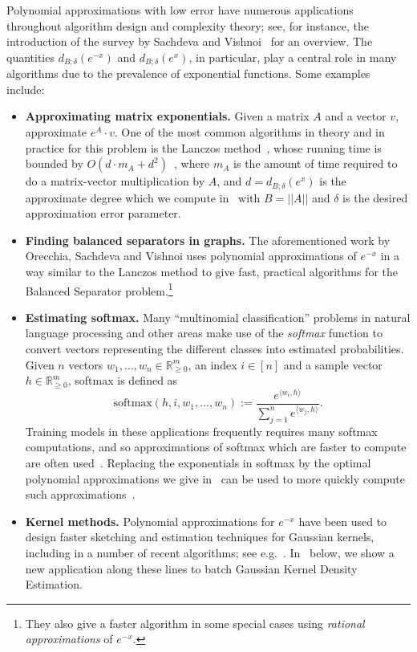 \documentclass[10pt,a4paper]{article}
\newcommand{\R}{\mathbb{R}}
\theoremstyle{plain}\newtheorem{theorem}{Theorem}
\theoremstyle{definition}
\begin{document}
Polynomial approximations with low error have numerous applications throughout algorithm design and complexity theory; see, for instance, the introduction of the survey by Sachdeva and Vishnoi~\cite{sachdeva2014faster} for an overview. 
The quantities $d_{B; \delta} (e^{-x})$ and $d_{B; \delta} (e^{x})$, in particular, play a central role in many algorithms due to the prevalence of exponential functions. Some examples include:
\begin{itemize}
    \item \textbf{Approximating matrix exponentials.} Given a matrix $A$ and a vector $v$, approximate $e^A \cdot v$. One of the most common algorithms in theory and in practice for this problem is the Lanczos method~\cite{lanczos1950iteration}, whose running time is bounded by $O(d \cdot m_A + d^2)$~\cite{musco2018stability}, where $m_A$ is the amount of time required to do a matrix-vector multiplication by $A$, and $d = d_{B; \delta} (e^{x})$ is the approximate degree which we compute in~ with $B = ||A||$ and $\delta$ is the desired approximation error parameter.
    \item \textbf{Finding balanced separators in graphs.} The aforementioned work by Orecchia, Sachdeva and Vishnoi \cite{orecchia2012approximating} uses polynomial approximations of $e^{-x}$ in a way similar to the Lanczos method to give fast, practical algorithms for the Balanced Separator problem.\footnote{They also give a faster algorithm in some special cases using \emph{rational approximations} of $e^{-x}$.}
    \item \textbf{Estimating softmax.} Many ``multinomial classification'' problems in natural language processing and other areas make use of the \emph{softmax} function to convert vectors representing the different classes into estimated probabilities. Given $n$ vectors $w_1, \ldots, w_n \in \R_{\geq 0}^m$, an index $i \in [n]$ and a sample vector $h \in \R_{\geq 0}^m$, softmax is defined as $$\text{softmax}(h,i,w_1,\ldots,w_n) := \frac{e^{\langle w_i, h \rangle}}{\sum_{j=1}^n e^{\langle w_j, h \rangle}}.$$ Training models in these applications frequently requires many softmax computations, and so approximations of softmax which are faster to compute are often used~\cite{chen2015strategies}. Replacing the exponentials in softmax by the optimal polynomial approximations we give in~ can be used to more quickly compute such approximations~\cite{joulin2017efficient,nilsson2014hardware}.
    \item \textbf{Kernel methods.} Polynomial approximations for $e^{-x}$ have been used to design faster sketching and estimation techniques for Gaussian kernels, including in a number of recent algorithms; see e.g.~\cite{yang2003improved,lee2019finding,alman2020algorithms,ahle2020oblivious}. In~ below, we show a new application along these lines to batch Gaussian Kernel Density Estimation.
\end{itemize}
\end{document}

